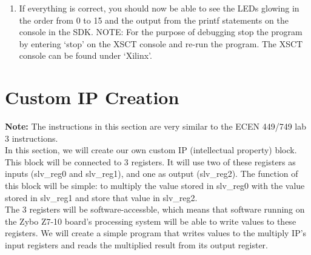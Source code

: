 \documentclass[11pt,twoside,titlepage]{article}
\begin{document}
\begin{enumerate}
\begin{enumerate}
			\item If everything is correct, you should now be able to see the LEDs glowing in the order from 0 to 15 and the output from the printf statements  on the console in the SDK.
			NOTE: For the purpose of debugging stop the program by entering `stop' on the XSCT console and re-run the program. The XSCT console can be found under `Xilinx'.
		\end{enumerate}   
		
	\end{enumerate}
	











\section{Custom IP Creation}

\noindent
\textbf{Note:} The instructions in this section are very similar to the ECEN 449/749 lab 3 instructions.\\

\noindent
In this section, we will create our own custom IP (intellectual property) block. This block will be connected to 3 registers. It will use two of these registers as inputs (slv\_reg0 and slv\_reg1), and one as output (slv\_reg2). The function of this block will be simple: to multiply the value stored in slv\_reg0 with the value stored in slv\_reg1 and store that value in slv\_reg2.\\

\noindent
The 3 registers will be software-accessble, which means that software running on the Zybo Z7-10 board's processing system will be able to write values to these registers. We will create a simple program that writes values to the multiply IP's input registers and reads the multiplied result from its output register.\\
\end{document}

